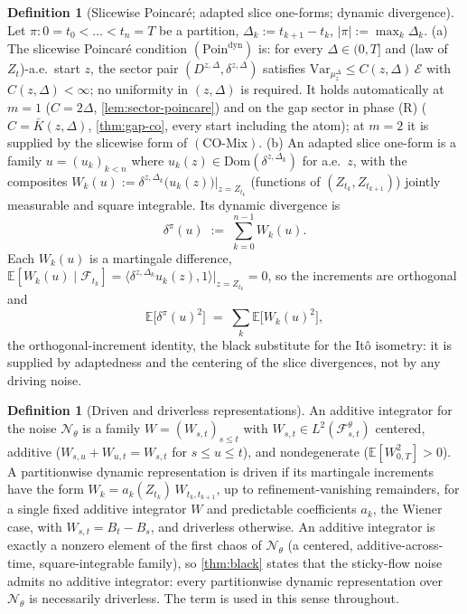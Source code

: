 \documentclass[reqno,final,11pt]{amsart}
\theoremstyle{plain}
\theoremstyle{definition}
\newtheorem{definition}[theorem]{Definition}
\theoremstyle{remark}
\newcommand{\E}{\mathbb E}
\newcommand{\Dom}{\mathrm{Dom}}
\newcommand{\cE}{\mathcal E}
\newcommand{\cF}{\mathcal F}
\newcommand{\cN}{\mathcal N}
\newcommand{\COmix}{(\mathrm{CO\text{-}Mix})}
\begin{document}
\begin{definition}[Slicewise Poincar\'e; adapted slice one-forms; dynamic divergence]\label{def:dynamic-div}
Let $\pi:0=t_0<\dots<t_n=T$ be a partition, $\Delta_k:=t_{k+1}-t_k$,
$|\pi|:=\max_k\Delta_k$.
\textnormal{(a)} The slicewise Poincar\'e condition $(\mathrm{Poin}^{\mathrm{dyn}})$ is: for every
$\Delta\in(0,T]$ and (law of $Z_t$)-a.e.\ start $z$, the sector pair
$(D^{z,\Delta},\delta^{z,\Delta})$ satisfies
$\mathrm{Var}_{\mu^\Delta_z}\le C(z,\Delta)\,\cE$ with $C(z,\Delta)<\infty$;
no uniformity in $(z,\Delta)$ is required. It holds automatically at
$m=1$ ($C=2\Delta$, \cref{lem:sector-poincare}) and on the gap sector in phase
\textnormal{(R)} ($C=\bar K(z,\Delta)$, \cref{thm:gap-co}, every start
including the atom); at $m=2$ it is supplied by the slicewise form of
$\COmix$.
\textnormal{(b)} An adapted slice one-form is a family
$u=(u_k)_{k<n}$ where $u_k(z)\in\Dom(\delta^{z,\Delta_k})$ for a.e.\ $z$, with
the composites $W_k(u):=\delta^{z,\Delta_k}\bigl(u_k(z)\bigr)\big|_{z=Z_{t_k}}$
(functions of $(Z_{t_k},Z_{t_{k+1}})$) jointly measurable and square
integrable. Its dynamic divergence is
\[
  \delta^{\pi}(u)\;:=\;\sum_{k=0}^{n-1}W_k(u).
\]
Each $W_k(u)$ is a martingale difference,
$\E[W_k(u)\mid\cF_{t_k}]=\langle\delta^{z,\Delta_k}u_k(z),1\rangle\big|_{z=Z_{t_k}}=0$,
so the increments are orthogonal and
\begin{equation}\label{eq:orth-incr}
  \E\bigl[\delta^{\pi}(u)^2\bigr]\;=\;\sum_{k}\E\bigl[W_k(u)^2\bigr],
\end{equation}
the orthogonal-increment identity, the black substitute for the It\^o
isometry: it is supplied by adaptedness and the centering of the slice
divergences, not by any driving noise.
\end{definition}

\begin{definition}[Driven and driverless representations]\label{def:driverless}
An additive integrator for the noise $\cN_\theta$ is a family
$W=(W_{s,t})_{s\le t}$ with $W_{s,t}\in L^2(\cF^{\theta}_{s,t})$ centered,
additive ($W_{s,u}+W_{u,t}=W_{s,t}$ for $s\le u\le t$), and nondegenerate
($\E[W_{0,T}^2]>0$). A partitionwise dynamic representation is driven
if its martingale increments have the form
$W_k=a_k(Z_{t_k})\,W_{t_k,t_{k+1}}$, up to refinement-vanishing remainders,
for a single fixed additive integrator $W$ and predictable coefficients $a_k$, the Wiener case, with $W_{s,t}=B_t-B_s$, and driverless
otherwise. An additive integrator is exactly a nonzero element of the first
chaos of $\cN_\theta$ (a centered, additive-across-time, square-integrable
family), so \cref{thm:black} states that the sticky-flow noise admits
no additive integrator: every partitionwise dynamic representation over
$\cN_\theta$ is necessarily driverless. The term is used in this sense
throughout.
\end{definition}
\end{document}
